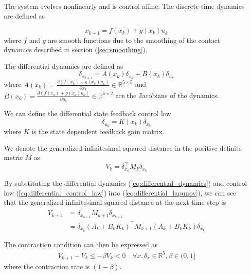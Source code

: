 \documentclass[journal]{IEEEtran}
\begin{document}
The system evolves nonlinearly and is control affine. The discrete-time dynamics are defined as

\begin{equation}
    x_{k+1} = f(x_k) + g(x_k)u_k
\end{equation}
where $f$ and $g$ are smooth functions due to the smoothing of the contact dynamics described in section (\ref{sec:smoothing}).

The differential dynamics are defined as
\begin{equation}
    \delta_{x_{k+1}} = A(x_k)\delta_{x_k} + B(x_k)\delta_{u_k}
	\label{eq:differential_dynamics}
\end{equation}
where $A(x_k) = \frac{\partial (f(x_k) + g(x_k)u_k)}{\partial x_k} \in \mathbb{R}^{5 \times 5}$ and $B(x_k) = \frac{\partial (f(x_k) + g(x_k)u_k)}{\partial u_k} \in \mathbb{R}^{5 \times 2}$ are the Jacobians of the dynamics.

We can define the differential state feedback control law
\begin{equation}
	\label{eq:differential_control_law}
    \delta_{u_k} = K(x_k)\delta_{x_k}
\end{equation}
where $K$ is the state dependent feedback gain matrix.

We denote the generalized infinitesimal squared distance in the positive definite metric $M$ as
\begin{equation}
    V_k = \delta^\top_{x_k} M_{k} \delta_{x_k}
	\label{eq:differential_lapunov}
\end{equation}

By substituting the differential dynamics (\ref{eq:differential_dynamics}) and control law (\ref{eq:differential_control_law}) into (\ref{eq:differential_lapunov}), we can see that the generalized infinitesimal squared distance at the next time step is
\begin{equation}
	\begin{aligned}
	V_{k+1} & = \delta^\top_{x_{k+1}} M_{k+1} \delta_{x_{k+1}} \\
	& = \delta^\top_{x_k} (A_k + B_k K_k)^\top M_{k+1} (A_k + B_k K_k)\delta_{x_k}
	\end{aligned}
\end{equation}

The contraction condition can then be expressed as
\begin{equation}
	\begin{aligned}
	V_{k+1} - V_k \leq 
	- \beta V_k <
	0 \quad \forall x, \delta_x \in \mathbb{R}^5, \beta \in (0,1]
	\end{aligned}
	\label{eq:lyapnov_contraction_condition}
\end{equation}
where the contraction rate is $(1-\beta)$.
\end{document}
